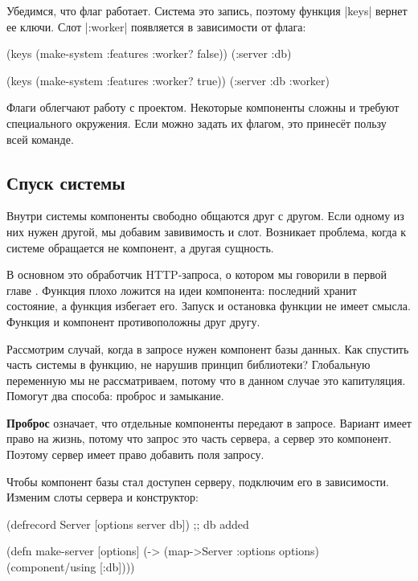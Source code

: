 Убедимся, что флаг работает. Система это запись, поэтому функция \spverb|keys|
вернет ее ключи. Слот \spverb|:worker| появляется в зависимости от флага:

\begin{english}
  \begin{clojure}
(keys (make-system {:features {:worker? false}}))
(:server :db)

(keys (make-system {:features {:worker? true}}))
(:server :db :worker)
  \end{clojure}
\end{english}

Флаги облегчают работу с проектом. Некоторые компоненты сложны и требуют
специального окружения. Если можно задать их флагом, это принес\"{е}т пользу
всей команде.

\subsection{Спуск системы}

Внутри системы компоненты свободно общаются друг с другом. Если одному из них
нужен другой, мы добавим завивимость и слот. Возникает проблема, когда к системе
обращается не компонент, а другая сущность.

В основном это обработчик HTTP-запроса, о котором мы говорили в первой
главе . Функция плохо ложится на идеи компонента: последний
хранит состояние, а функция избегает его. Запуск и остановка функции не имеет
смысла. Функция и компонент противоположны друг другу.

Рассмотрим случай, когда в запросе нужен компонент базы данных. Как спустить
часть системы в функцию, не нарушив принцип библиотеки? Глобальную переменную мы
не рассматриваем, потому что в данном случае это капитуляция. Помогут два
способа: проброс и замыкание.

\textbf{Проброс} означает, что отдельные компоненты передают в запросе. Вариант
имеет право на жизнь, потому что запрос это часть сервера, а сервер это
компонент. Поэтому сервер имеет право добавить поля запросу.

Чтобы компонент базы стал доступен серверу, подключим его в зависимости. Изменим
слоты сервера и конструктор:

\begin{english}
  \begin{clojure}
(defrecord Server
  [options server db]) ;; db added

(defn make-server
  [options]
  (-> (map->Server {:options options})
      (component/using [:db])))
  \end{clojure}
\end{english}

